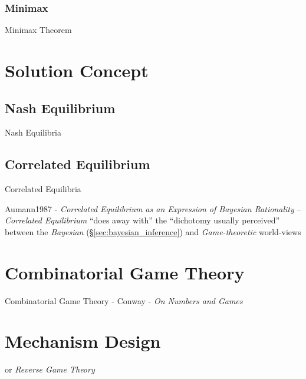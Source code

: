 \subsubsection{Minimax}\label{sec:minimax}

Minimax Theorem



\section{Solution Concept}\label{sec:solution_concept}

\subsection{Nash Equilibrium}\label{sec:nash_equilibrium}

Nash Equilibria



\subsection{Correlated Equilibrium}\label{sec:correlated_equilibrium}

Correlated Equilibria

Aumann1987 - \emph{Correlated Equilibrium as an Expression of Bayesian
  Rationality} -- \emph{Correlated Equilibrium} ``does away with'' the
``dichotomy usually perceived'' between the \emph{Bayesian}
(\S\ref{sec:bayesian_inference}) and \emph{Game-theoretic} world-views



\section{Combinatorial Game Theory}\label{sec:combinatorial_game_theory}

Combinatorial Game Theory - Conway  - \emph{On Numbers and Games}



\section{Mechanism Design}\label{sec:mechanism_design}

or \emph{Reverse Game Theory}
